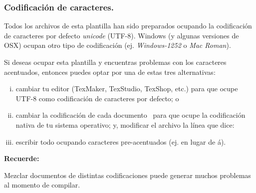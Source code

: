 \subsubsection*{Codificación de caracteres.}

Todos los archivos  de esta plantilla han sido preparados ocupando la codificación de caracteres por defecto \emph{unicode} (UTF-8). Windows (y algunas versiones de OSX) ocupan otro tipo de codificación (ej. \emph{Windows-1252} o \emph{Mac Roman}).

Si deseas ocupar esta plantilla y encuentras problemas con los caracteres acentuados, entonces puedes optar por una de estas tres alternativas:
\begin{enumerate}[i)]
    \item cambiar tu editor (TexMaker, TexStudio, TexShop, etc.) para que ocupe UTF-8 como codificación de caracteres por defecto; o
    
    \item cambiar la codificación de cada documento  para que ocupe la codificación nativa de tu sistema operativo; y, modificar el archivo  la línea que dice:
    
    
    \item escribir todo ocupando caracteres pre-acentuados (ej.  en lugar de á).
\end{enumerate}

\vspace{10mm}
\begin{framed}
    \noindent\textbf{Recuerde:} 
    
    Mezclar documentos de distintas codificaciones puede generar muchos problemas al momento de compilar.  
\end{framed}

